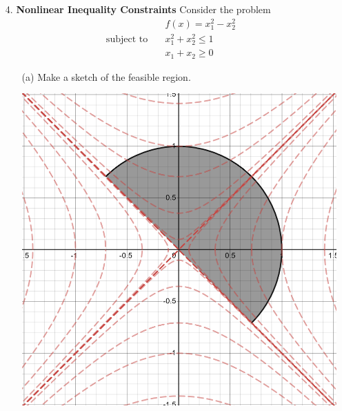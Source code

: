 \documentclass{article}
\begin{document}
\begin{itemize}
\begin{itemize}
    \end{itemize}
\pagebreak
    \item[4.] \textbf{Nonlinear Inequality Constraints}
    \newline\newline
    Consider the problem
    \begin{align*}
        &f(x) = x_1^2 - x_2^2\\
        \text{subject to} \hspace{1em} &x_1^2 + x_2^2 \leq 1\\
        &x_1 + x_2 \geq 0
    \end{align*}
    \begin{itemize}
        \item[(a)] Make a sketch of the feasible region.
        \newline\newline
        \begin{center}
            \includegraphics[scale = 0.6]{feasibleRegion4}
        \end{center}


\end{itemize}
\end{itemize}
\end{document}
